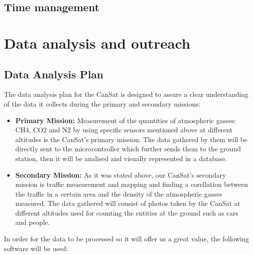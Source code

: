 \documentclass[11pt]{article}
\begin{document}
\subsection{Time management}




\section{Data analysis and outreach}

\subsection{Data Analysis Plan}
The data analysis plan for the CanSat is designed to assure a clear understanding of the data it collects during the primary and secondary missions:
\begin{itemize}
\item \textbf{Primary Mission:} Measurement of the quantities of atmospheric gasses: CH4, CO2 and N2 by using specific sensors mentioned above at different altitudes is the CanSat's primary mission. The data gathered by them will be directly sent to the microcontroller which further sends them to the ground station, then it will be analised and visually represented in a database.
\item \textbf{Secondary Mission:} As it was stated above, our CanSat's secondary mission is traffic measurement and mapping and finding a corellation between the traffic in a certain area and the density of the atmospheric gasses measured. The data gathered will consist of photos taken by the CanSat at different altitudes used for counting the entities at the ground such as cars and people.
\end {itemize}
In order for the data to be processed so it will offer us a great value, the following software will be used:
\end{document}
